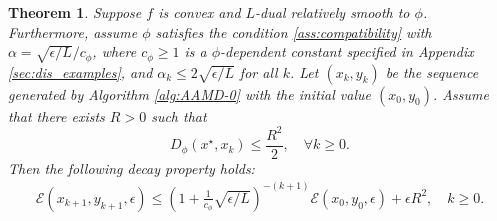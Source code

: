 \documentclass{article}
\theoremstyle{plain}
\newtheorem{theorem}{Theorem}[section]
\theoremstyle{definition}
\theoremstyle{remark}
\begin{document}
\begin{theorem}
		\label{thm:convergence rate of fixed epsilon}
		Suppose $f$ is convex and $L$-dual relatively smooth to $\phi$. Furthermore, assume $\phi$ satisfies the condition \eqref{ass:compatibility} with $\alpha=\sqrt{\epsilon/L}/c_{\phi}$, where $c_{\phi}\geq 1$ is a $\phi$-dependent constant specified in Appendix \ref{sec:dis_examples}, and $\alpha_k\leq 2\sqrt{\epsilon/L}$ for all $k$. Let $(x_k, y_k)$ be the sequence generated by Algorithm \ref{alg:AAMD-0} with the initial value $(x_0, y_0)$. Assume that there exists $R >0$ such that
		\begin{equation}\label{eq:boundednorm}
			D_\phi(x^{\star}, x_k) \leq \frac{R^2}{2}, \quad \forall k \geq 0.
		\end{equation}
		Then the following decay property holds:
		\begin{equation}\label{eq: perturbed AOR-VOS Ealpha decay}
			\begin{aligned}
				\mathcal{E}(x_{k+1}, y_{k+1},\epsilon) \leq  \left(1 + \frac{1}{c_{\phi}} \sqrt{\epsilon/L}\right)^{-(k+1)}\mathcal{E}(x_{0}, y_{0},\epsilon) + 
				\epsilon R^2, \quad k \geq 0.
			\end{aligned}
		\end{equation}
	\end{theorem}
\end{document}
